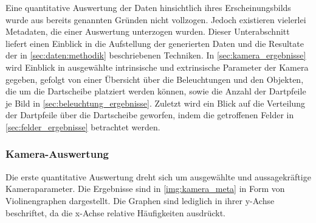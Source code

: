 Eine quantitative Auswertung der Daten hinsichtlich ihres Erscheinungsbilds wurde aus bereits genannten Gründen nicht vollzogen. Jedoch existieren vielerlei Metadaten, die einer Auswertung unterzogen wurden. Dieser Unterabschnitt liefert einen Einblick in die Aufstellung der generierten Daten und die Resultate der in \autoref{sec:daten:methodik} beschriebenen Techniken. In \autoref{sec:kamera_ergebnisse} wird Einblick in ausgewählte intrinsische und extrinsische Parameter der Kamera gegeben, gefolgt von einer Übersicht über die Beleuchtungen und den Objekten, die um die Dartscheibe platziert werden können, sowie die Anzahl der Dartpfeile je Bild in \autoref{sec:beleuchtung_ergebnisse}. Zuletzt wird ein Blick auf die Verteilung der Dartpfeile über die Dartscheibe geworfen, indem die getroffenen Felder in \autoref{sec:felder_ergebnisse} betrachtet werden.

\subsubsection{Kamera-Auswertung}
\label{sec:kamera_ergebnisse}

Die erste quantitative Auswertung dreht sich um ausgewählte und aussagekräftige Kameraparameter. Die Ergebnisse sind in \autoref{img:kamera_meta} in Form von Violinengraphen dargestellt. Die Graphen sind lediglich in ihrer y-Achse beschriftet, da die x-Achse relative Häufigkeiten ausdrückt.

